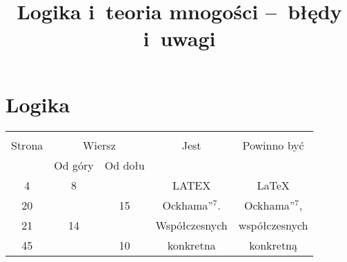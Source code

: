 \documentclass[a4paper,11pt]{article}
\title{Logika i~teoria mnogości --~błędy i~uwagi}
\begin{document}



\maketitle  %



\section{Logika}

\vspace{\spaceTwo}





\begin{center}
  \begin{tabular}{|c|c|c|c|c|}
    \hline
    & \multicolumn{2}{c|}{} & & \\
    Strona & \multicolumn{2}{c|}{Wiersz} & Jest
                              & Powinno być \\ \cline{2-3}
    & Od góry & Od dołu & & \\
    \hline
    4   &  8 & & LATEX & \LaTeX \\
    20  & & 15 & Ockhama''$^{ 7 }$. & Ockhama''$^{ 7 }$, \\
    21  & 14 & & Współczesnych & współczesnych \\
    45  & & 10 & konkretna & konkretną \\
    \hline
  \end{tabular}
\end{center}
\end{document}
